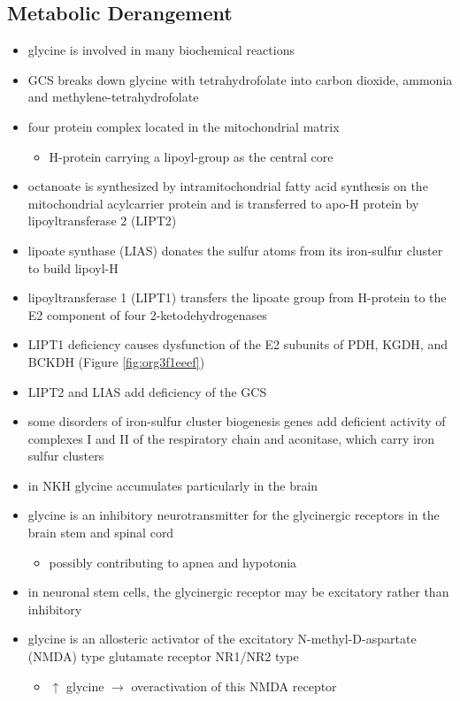 \documentclass[12pt]{scrartcl}
\begin{document}
\begin{center}
\begin{center}
\subsection{Metabolic Derangement}
\label{sec:org748733a}
\begin{itemize}
\item glycine is involved in many biochemical reactions
\item GCS breaks down glycine with tetrahydrofolate into carbon dioxide,
ammonia and methylene-tetrahydrofolate
\item four protein complex located in the mitochondrial matrix
\begin{itemize}
\item H-protein carrying a lipoyl-group as the central core
\end{itemize}
\item octanoate is synthesized by intramitochondrial fatty acid synthesis
on the mitochondrial acylcarrier protein and is transferred to apo-H
protein by lipoyltransferase 2 (LIPT2)
\item lipoate synthase (LIAS) donates the sulfur atoms from its
iron-sulfur cluster to build lipoyl-H
\item lipoyltransferase 1 (LIPT1) transfers the lipoate group from
H-protein to the E2 component of four 2-ketodehydrogenases
\item LIPT1 deficiency causes dysfunction of the E2 subunits of PDH, KGDH,
and BCKDH (Figure \ref{fig:org3f1eeef})
\item LIPT2 and LIAS add deficiency of the GCS
\item some disorders of iron-sulfur cluster biogenesis genes add deficient
activity of complexes I and II of the respiratory chain and
aconitase, which carry iron sulfur clusters
\item in NKH glycine accumulates particularly in the brain
\item glycine is an inhibitory neurotransmitter for the glycinergic
receptors in the brain stem and spinal cord
\begin{itemize}
\item possibly contributing to apnea and hypotonia
\end{itemize}
\item in neuronal stem cells, the glycinergic receptor may be excitatory
rather than inhibitory
\item glycine is an allosteric activator of the excitatory
N-methyl-D-aspartate (NMDA) type glutamate receptor NR1/NR2 type
\begin{itemize}
\item \(\uparrow\) glycine \(\to\) overactivation of this NMDA receptor
\end{itemize}
\end{itemize}

\end{center}
\end{center}
\end{document}
